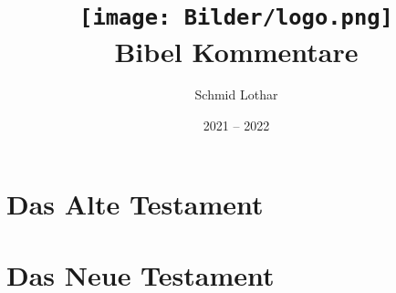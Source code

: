 \documentclass{inc/bible_class}
\author{Schmid Lothar}
\date{2021 -- 2022}
\title{
    \texttt{[image: Bilder/logo.png]}\\
    \textbf{Bibel Kommentare}
}
\begin{document}
\maketitle
\tableofcontents

\newpage


\chapter{Das Alte Testament}

\chapter{Das Neue Testament}
%

\end{document}
